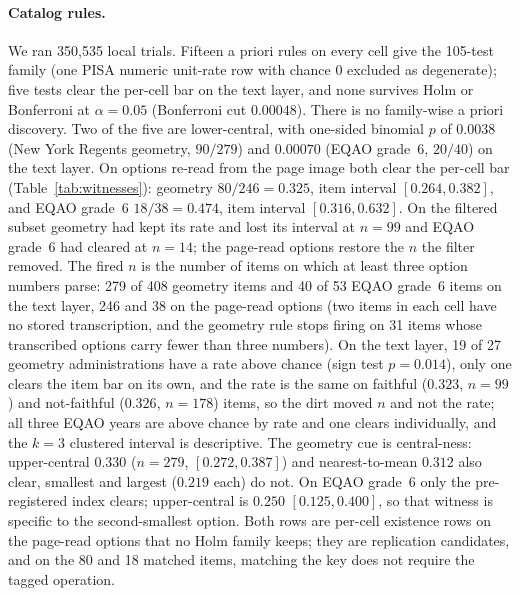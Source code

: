 \paragraph{Catalog rules.}
We ran 350{,}535 local trials. Fifteen a priori rules on every cell give the 105-test family (one PISA numeric unit-rate row with chance $0$ excluded as degenerate); five tests clear the per-cell bar on the text layer, and none survives Holm or Bonferroni at $\alpha=0.05$ (Bonferroni cut $0.00048$). There is no family-wise a priori discovery. Two of the five are lower-central, with one-sided binomial $p$ of $0.0038$ (New York Regents geometry, $90/279$) and $0.00070$ (EQAO grade~6, $20/40$) on the text layer. On options re-read from the page image both clear the per-cell bar (Table~\ref{tab:witnesses}): geometry $80/246=0.325$, item interval $[0.264, 0.382]$, and EQAO grade~6 $18/38=0.474$, item interval $[0.316, 0.632]$. On the filtered subset geometry had kept its rate and lost its interval at $n=99$ and EQAO grade~6 had cleared at $n=14$; the page-read options restore the $n$ the filter removed. The fired $n$ is the number of items on which at least three option numbers parse: 279 of 408 geometry items and 40 of 53 EQAO grade~6 items on the text layer, 246 and 38 on the page-read options (two items in each cell have no stored transcription, and the geometry rule stops firing on 31 items whose transcribed options carry fewer than three numbers). On the text layer, 19 of 27 geometry administrations have a rate above chance (sign test $p=0.014$), only one clears the item bar on its own, and the rate is the same on faithful ($0.323$, $n=99$) and not-faithful ($0.326$, $n=178$) items, so the dirt moved $n$ and not the rate; all three EQAO years are above chance by rate and one clears individually, and the $k=3$ clustered interval is descriptive. The geometry cue is central-ness: upper-central $0.330$ ($n=279$, $[0.272, 0.387]$) and nearest-to-mean $0.312$ also clear, smallest and largest ($0.219$ each) do not. On EQAO grade~6 only the pre-registered index clears; upper-central is $0.250$ $[0.125, 0.400]$, so that witness is specific to the second-smallest option. Both rows are per-cell existence rows on the page-read options that no Holm family keeps; they are replication candidates, and on the 80 and 18 matched items, matching the key does not require the tagged operation.

